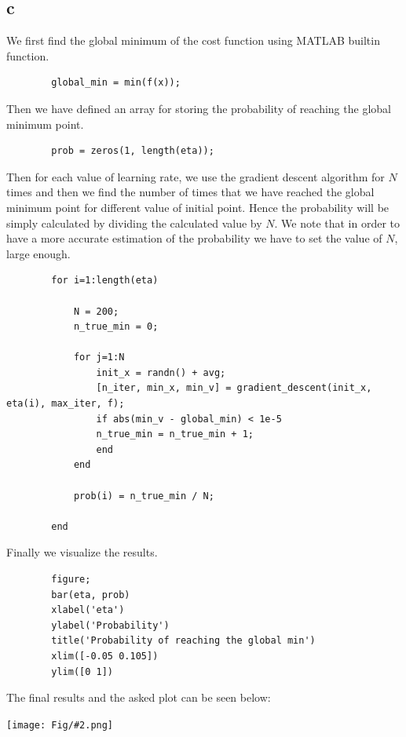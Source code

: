 \documentclass[]{article}
\newcommand{\pict}[2]{\begin{center}
		\texttt{[image: Fig/\#2.png]}
\end{center}}
\begin{document}
	\subsection*{c}
	We first find the global minimum of the cost function using MATLAB builtin function.
	\begin{lstlisting}
		global_min = min(f(x));
	\end{lstlisting}
	Then we have defined an array for storing the probability of reaching the global minimum point.
	\begin{lstlisting}
		prob = zeros(1, length(eta));
	\end{lstlisting}
	Then for each value of learning rate, we use the gradient descent algorithm for $N$ times and then we find the number of times that we have reached the global minimum point for different value of initial point. Hence the probability will be simply calculated by dividing the calculated value by $N$. We note that in order to have a more accurate estimation of the probability we have to set the value of $N$, large enough.
	\begin{lstlisting}
		for i=1:length(eta)
		
			N = 200;
			n_true_min = 0;
			
			for j=1:N
				init_x = randn() + avg;
				[n_iter, min_x, min_v] = gradient_descent(init_x, eta(i), max_iter, f);
				if abs(min_v - global_min) < 1e-5
				n_true_min = n_true_min + 1;
				end
			end
			
			prob(i) = n_true_min / N;
			
		end
	\end{lstlisting}
	Finally we visualize the results.
	\begin{lstlisting}
		figure;
		bar(eta, prob)
		xlabel('eta')
		ylabel('Probability')
		title('Probability of reaching the global min')
		xlim([-0.05 0.105])
		ylim([0 1])
	\end{lstlisting}
	The final results and the asked plot can be seen below:
	\pict{0.4}{F10}
\end{document}
